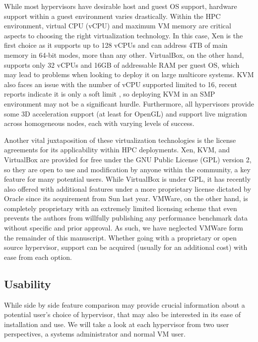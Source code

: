 While most hypervisors have desirable host and guest OS support, hardware support within a guest environment varies drastically.  Within the HPC environment, virtual CPU (vCPU) and maximum VM memory are critical aspects to choosing the right virtualization technology.  In this case, Xen is the first choice as it supports up to 128 vCPUs and can address 4TB of main memory in 64-bit modes, more than any other.  VirtualBox, on the other hand, supports only 32 vCPUs and 16GB of addressable RAM per guest OS, which may lead to problems when looking to deploy it on large multicore systems.  KVM also faces an issue with the number of vCPU supported limited to 16, recent reports indicate it is only a soft limit \cite{Harper2009}, so deploying KVM in an SMP environment may not be a significant hurdle. Furthermore, all hypervisors provide some 3D acceleration support (at least for OpenGL) and support live migration across homogeneous nodes, each with varying levels of success.  

Another vital juxtaposition of these virtualization technologies is the license agreements for its applicability within HPC deployments.  Xen, KVM, and VirtualBox are provided for free under the GNU Public License (GPL) version 2, so they are open to use and modification by anyone within the community, a key feature for many potential users.  While VirtualBox is  under GPL, it has recently also offered with additional features under a more proprietary license dictated by Oracle since its acquirement from Sun last year.  VMWare, on the other hand, is completely proprietary with an extremely limited licensing scheme that even prevents the authors from willfully publishing any performance benchmark data without specific and prior approval.  As such, we have neglected VMWare form the remainder of this manuscript. Whether going with a proprietary or open source hypervisor, support can be acquired (usually for an additional cost) with ease from each option.   

\subsection{Usability}

While side by side feature comparison may provide crucial information about a potential user's choice of hypervisor, that may also be interested in its ease of installation and use.  We will take a look at each hypervisor from two user perspectives, a systems administrator and normal VM user.  

